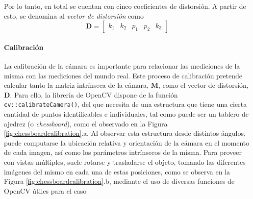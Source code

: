 Por lo tanto, en total se cuentan con cinco coeficientes de distorsión. A partir de esto, se denomina al \textit{vector de distorsión} como
\begin{equation}
    \bm{D} = 
    \begin{bmatrix}
    k_1 & k_2 & p_1 & p_2 & k_3
    \end{bmatrix}
    \label{eq:distortionvector}
\end{equation}

\paragraph{Calibración}
La calibración de la cámara es importante para relacionar las mediciones de la misma con las mediciones del mundo real. Este proceso de calibración pretende calcular tanto la matriz intrínseca de la cámara, $\bm{M}$, como el vector de distorsión, $\bm{D}$. Para ello, la librería de OpenCV dispone de la función \texttt{cv::calibrateCamera()}, del que necesita de una estructura que tiene una cierta cantidad de puntos identificables e individuales, tal como puede ser un tablero de ajedrez (o \textit{chessboard}), como el observado en la Figura \ref{fig:chessboardcalibration}.a. Al observar esta estructura desde distintos ángulos, puede computarse la ubicación relativa y orientación de la cámara en el momento de cada imagen, así como los parámetros intrínsecos de la misma. Para proveer con vistas múltiples, suele rotarse y trasladarse el objeto, tomando las diferentes imágenes del mismo en cada una de estas posiciones, como se observa en la Figura \ref{fig:chessboardcalibration}.b, mediante el uso de diversas funciones de OpenCV útiles para el caso \cite{kaehler2017}

